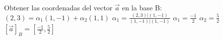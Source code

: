\documentclass[preview]{standalone}
\begin{document}
\begin{center}
Obtener las coordenadas del vector $\vec{a}$ en la base B:  $(2,3) = \alpha_1 (1, -1) + \alpha_2 (1, 1)$ $\alpha_1 = \frac{(2,3)|(1,-1)}{(1, -1) | (1, -1)}$ $\alpha_1 = \frac{-1}{2}$ $\alpha_2 = \frac{5}{2}$ $[\vec{a}]_B =  [\frac{-1}{2}, \frac{5}{2}]$
\end{center}
\end{document}
